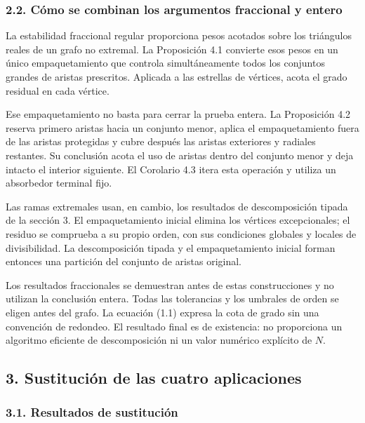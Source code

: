 \documentclass[spanish,11pt,a4paper]{article}
\begin{document}
\subsubsection{2.2. Cómo se combinan los argumentos fraccional y entero}\label{cuxf3mo-se-combinan-los-argumentos-fraccional-y-entero}

La estabilidad fraccional regular proporciona pesos acotados sobre los triángulos reales de un grafo no extremal. La Proposición 4.1 convierte esos pesos en un único empaquetamiento que controla simultáneamente todos los conjuntos grandes de aristas prescritos. Aplicada a las estrellas de vértices, acota el grado residual en cada vértice.

Ese empaquetamiento no basta para cerrar la prueba entera. La Proposición 4.2 reserva primero aristas hacia un conjunto menor, aplica el empaquetamiento fuera de las aristas protegidas y cubre después las aristas exteriores y radiales restantes. Su conclusión acota el uso de aristas dentro del conjunto menor y deja intacto el interior siguiente. El Corolario 4.3 itera esta operación y utiliza un absorbedor terminal fijo.

Las ramas extremales usan, en cambio, los resultados de descomposición tipada de la sección 3. El empaquetamiento inicial elimina los vértices excepcionales; el residuo se comprueba a su propio orden, con sus condiciones globales y locales de divisibilidad. La descomposición tipada y el empaquetamiento inicial forman entonces una partición del conjunto de aristas original.

Los resultados fraccionales se demuestran antes de estas construcciones y no utilizan la conclusión entera. Todas las tolerancias y los umbrales de orden se eligen antes del grafo. La ecuación (1.1) expresa la cota de grado sin una convención de redondeo. El resultado final es de existencia: no proporciona un algoritmo eficiente de descomposición ni un valor numérico explícito de \(N\).


\subsection{3. Sustitución de las cuatro aplicaciones}\label{sustituciuxf3n-de-las-cuatro-aplicaciones}

\subsubsection{3.1. Resultados de sustitución}\label{resultados-de-sustituciuxf3n}
\end{document}
